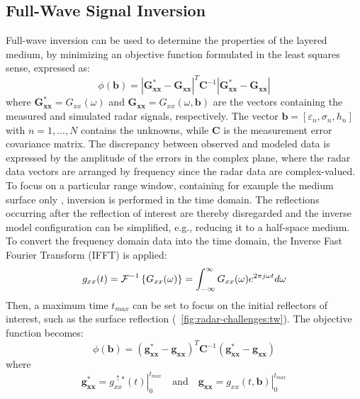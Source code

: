 \subsection{Full-Wave Signal Inversion} \label{sec:radar-challenges:inversion}
Full-wave inversion can be used to determine the properties of the layered medium, by minimizing an objective function formulated in the least squares sense, expressed as:
\begin{equation}\label{OF}
\phi(\mathbf{b})=
\left|\mathbf{G^*_{xx}}-\mathbf{G_{xx}}\right|^T\mathbf{C}^{-1}
\left|\mathbf{G^*_{xx}}-\mathbf{G_{xx}}\right|
\end{equation}
where $\mathbf{G^*_{xx}}=G_{xx}(\omega)$ and $\mathbf{G_{xx}}=G_{xx}(\omega,\mathbf{b})$ are the vectors containing the measured and simulated radar signals, respectively. The vector $\mathbf{b}=[\varepsilon_n, \sigma_n, h_n]$ with $n=1,...,N$ contains the unknowns, while $\mathbf{C}$ is the measurement error covariance matrix. The discrepancy between observed and modeled data is expressed by the amplitude of the errors in the complex plane, where the radar data vectors are arranged by frequency since the radar data are complex-valued. To focus on a particular range window, containing for example the medium surface only \cite{Lambot:2006}, inversion is performed in the time domain. The reflections occurring after the reflection of interest are thereby disregarded and the inverse model configuration can be simplified, e.g., reducing it to a half-space medium. To convert the frequency domain data into the time domain, the Inverse Fast Fourier Transform (IFFT) is applied:
\begin{equation}
\label{eq:radar-challenges:ifft}
g_{xx}(t)=\text{$\cal{F}$}^{-1}\left\{
G_{xx}(\omega)
\right\}=\int_{-\infty}^{\infty}G_{xx}(\omega)e^{2\pi j \omega
t}d\omega
\end{equation}
Then, a maximum time $t_{max}$ can be set to focus on the initial reflectors of interest, such as the surface reflection (\fig~\ref{fig:radar-challenges:tw}). The objective function becomes:
\begin{equation}\label{eq:radar-challenges:OFTD}
\phi(\mathbf{b})=
\left(\mathbf{g_{xx}^{*}}-\mathbf{g_{xx}}\right)^T\mathbf{C}^{-1}
\left(\mathbf{g_{xx}^{*}}-\mathbf{g_{xx}}\right)
\end{equation}
where
\begin{equation}\label{eq:radar-challenges:tmax}
\mathbf{g_{xx}^{*}}=\left.g_{xx}^{\uparrow*}(t)\right|_{0}^{t_{max}}
\quad\text{and}\quad
\mathbf{g_{xx}}=\left.g_{xx}(t,\mathbf{b})\right|_{0}^{t_{max}}
\end{equation}
